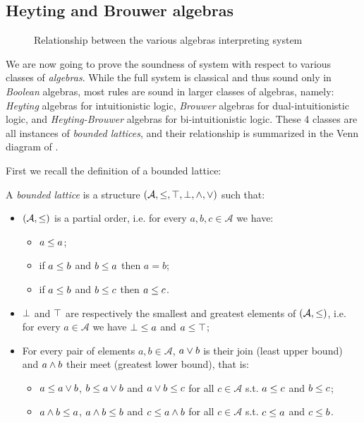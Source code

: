 \subsection{Heyting and Brouwer algebras}

\begin{figure*}
  \caption{Relationship between the various algebras interpreting system }
\end{figure*}

We are now going to prove the soundness of system  with respect to
various classes of \emph{algebras}. While the full system is classical and thus
sound only in \emph{Boolean} algebras, most rules are sound in larger classes of
algebras, namely: \emph{Heyting} algebras for intuitionistic logic,
\emph{Brouwer} algebras for dual-intuitionistic logic, and
\emph{Heyting-Brouwer} algebras for bi-intuitionistic logic. These 4 classes are
all instances of \emph{bounded lattices}, and their relationship is summarized
in the Venn diagram of .

First we recall the definition of a bounded lattice:

\begin{definition}
  A \emph{bounded lattice} is a structure $(\mathcal{A}, \leq, \top, \bot, \land,
  \lor)$ such that:
  \begin{itemize}
    \item $(\mathcal{A}, \leq)$ is a partial order, i.e. for every $a, b, c
    \in \mathcal{A}$ we have:
      \begin{itemize}
        \item $a \leq a$;
        \item if $a \leq b$ and $b \leq a$ then $a = b$;
        \item if $a \leq b$ and $b \leq c$ then $a \leq c$.
      \end{itemize}
    \item $\bot$ and $\top$ are respectively the smallest and greatest
    elements of $(\mathcal{A}, \leq)$, i.e. for every $a \in \mathcal{A}$ we
    have $\bot \leq a$ and $a \leq \top$;
    \item For every pair of elements $a, b \in \mathcal{A}$, $a \lor b$ is
    their join (least upper bound) and $a \land b$ their meet (greatest lower
    bound), that is:
    \begin{itemize}
      \item $a \leq a \lor b$, $b \leq a \lor b$ and $a \lor b \leq c$ for all $c \in \mathcal{A}$ s.t. $a \leq c$ and $b \leq c$;
      \item $a \land b \leq a$, $a \land b \leq b$ and $c \leq a \land b$ for all $c \in \mathcal{A}$ s.t. $c \leq a$ and $c \leq b$.
    \end{itemize}
  \end{itemize}
\end{definition}

